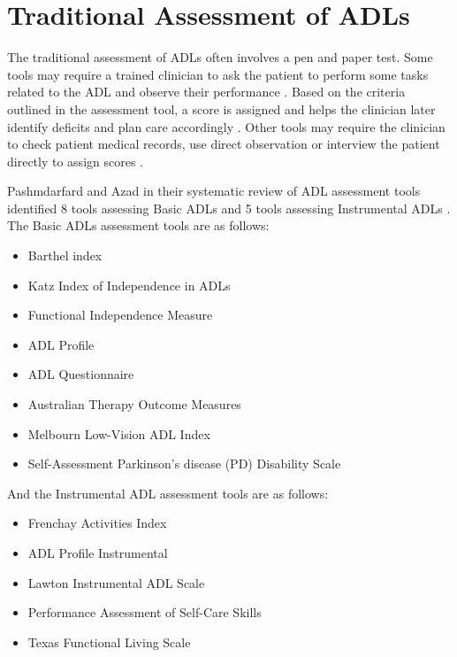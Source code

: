 \section{Traditional Assessment of ADLs}
The traditional assessment of ADLs often involves a pen and paper test. Some tools may require a trained clinician to ask the patient to perform some tasks related to the ADL and observe their performance \cite{pashmdarfard_assessment_2020}. Based on the criteria outlined in the assessment tool, a score is assigned and helps the clinician later identify deficits and plan care accordingly \cite{mcmahon_katz_nodate}. Other tools may require the clinician to check patient medical records, use direct observation or interview the patient directly to assign scores \cite{katz_for_the_association_of_rheumatology_health_professionals_outcomes_measures_task_force_measures_2003}. 

Pashmdarfard and Azad in their systematic review of ADL assessment tools identified 8 tools assessing Basic ADLs and 5 tools assessing Instrumental ADLs \cite{pashmdarfard_assessment_2020}. The Basic ADLs assessment tools are as follows:

\begin{itemize}
    \item Barthel index
    \item Katz Index of Independence in ADLs
    \item Functional Independence Measure
    \item ADL Profile
    \item ADL Questionnaire
    \item Australian Therapy Outcome Measures
    \item Melbourn Low-Vision ADL Index
    \item Self-Assessment Parkinson's disease (PD) Disability Scale 
\end{itemize}

And the Instrumental ADL assessment tools are as follows:

\begin{itemize}
    \item Frenchay Activities Index
    \item ADL Profile Instrumental
    \item Lawton Instrumental ADL Scale
    \item Performance Assessment of Self-Care Skills
    \item Texas Functional Living Scale
\end{itemize}


